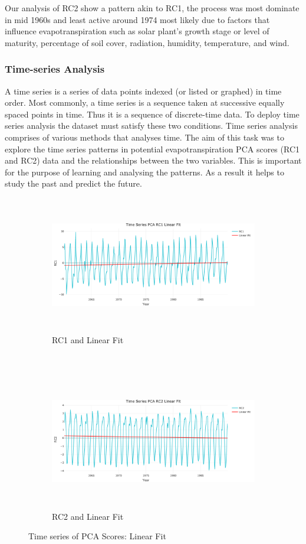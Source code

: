 \documentclass[12pt,a4paper]{article}
\begin{document}
Our analysis of RC2 show a pattern akin to RC1, the process was most dominate in mid 1960s and least active around 1974 most likely due to factors that influence evapotranspiration such as solar plant's growth stage or level of maturity, percentage of soil cover, radiation, humidity, temperature, and wind.
\subsubsection{Time-series Analysis}
A time series is a series of data points indexed (or listed or graphed) in time order\cite{wei2006time}. Most commonly, a time series is a sequence taken at successive equally spaced points in time. Thus it is a sequence of discrete-time data. To deploy time series analysis the dataset must satisfy these two conditions. Time series analysis comprises of various methods that analyses time. The aim of this task was to explore the time series patterns in potential evapotranspiration PCA scores (RC1 and RC2) data and the relationships between the two variables. This is important for the purpose of learning and analysing the patterns. As a result it helps to study the past and predict the future.
\begin{figure}[!h]
    \centering
    \begin{subfigure}[t]{0.5\textwidth}
        \centering
        \includegraphics[width=\textwidth,height=170pt]{./gaphics/q002_d.png}
        \caption{RC1 and Linear Fit} 
    \end{subfigure}%
    ~ 
    \begin{subfigure}[t]{0.5\textwidth}
        \centering
        \includegraphics[width=\textwidth,height=170pt]{./gaphics/q002_f.png}
        \caption{RC2 and Linear Fit} 
    \end{subfigure}
    \caption{Time series of PCA Scores: Linear Fit}
    \label{fig:linear_fit}
\end{figure}
\end{document}
